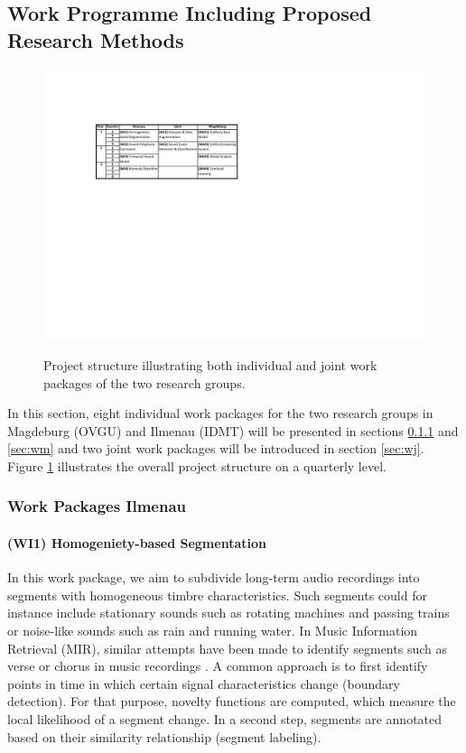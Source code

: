 \documentclass[11pt]{article}
\newcommand{\wpdef}[2]{\hypertarget{sec:W#1}{\paragraph*{(W#1) #2}\label{sec:W#1}}}
\begin{document}
\subsection{Work Programme Including Proposed Research Methods}

\begin{figure}[h]
\centering
\includegraphics[width=.7\linewidth]{figures/wp_timetable.pdf}
 \label{fig:project_plan}
  \caption{Project structure illustrating both individual and joint work packages of the two research groups.}
  \end{figure}

In this section, eight individual work packages for the two research groups in Magdeburg (OVGU) and Ilmenau (IDMT) will be presented in sections \ref{sec:wi} and \ref{sec:wm} and two joint work packages will be introduced in section \ref{sec:wj}. Figure \ref{fig:project_plan} illustrates the overall project structure on a quarterly level.


\subsubsection{Work Packages Ilmenau}
\label{sec:wi}

\wpdef{I1}{Homogeniety-based Segmentation }

In this work package, we aim to subdivide long-term audio recordings into segments with homogeneous timbre characteristics. Such segments could for instance include stationary sounds such as rotating machines and passing trains or noise-like sounds such as rain and running water.
In Music Information Retrieval (MIR), similar attempts have been made to identify segments such as verse or chorus in music recordings \cite{Mueller:2015:MusicProcessing:BOOK}.
A common approach is to first identify points in time in which certain signal characteristics change (boundary detection). For that purpose, novelty functions are computed, which measure the local likelihood of a segment change. In a second step, segments are annotated based on their similarity relationship (segment labeling).
\end{document}
